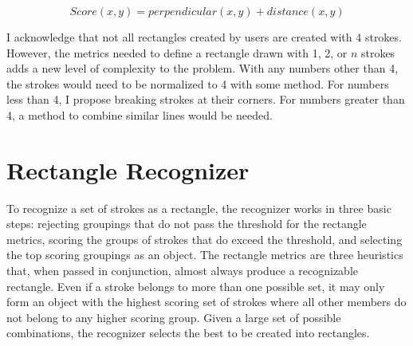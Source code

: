 \begin{equation}
\label{equ:comboscoring}
Score(x,y) = perpendicular(x,y) + distance(x,y)
\end{equation}



I acknowledge that not all rectangles created by users are created with 4 strokes. However, the metrics needed to define a rectangle drawn with 1, 2, or $n$ strokes adds a new level of complexity to the problem. With any numbers other than 4, the strokes would need to be normalized to 4 with some method. For numbers less than 4, I propose breaking strokes at their corners. For numbers greater than 4, a method to combine similar lines would be needed.

\section{Rectangle Recognizer}
\label{sec:rectrecognizer}

To recognize a set of strokes as a rectangle, the recognizer works in three basic steps: rejecting groupings that do not pass the threshold for the rectangle metrics, scoring the groups of strokes that do exceed the threshold, and selecting the top scoring groupings as an object. The rectangle metrics are three heuristics that, when passed in conjunction, almost always produce a recognizable rectangle. Even if a stroke belongs to more than one possible set, it may only form an object with the highest scoring set of strokes where all other members do not belong to any higher scoring group. Given a large set of possible combinations, the recognizer selects the best to be created into rectangles.

